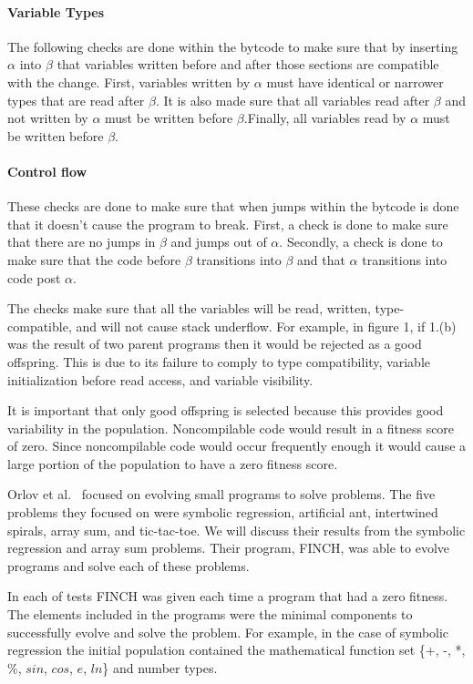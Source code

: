 \documentclass{sig-alternate}
\begin{document}
\paragraph{Variable Types}
The following checks are done within the bytcode to make sure that by inserting $\alpha$ into $\beta$ that variables written before and after those sections are compatible with the change. 
First, variables written by $\alpha$ must have identical or narrower types that are read after $\beta$. It is also made sure that all variables read after $\beta$ and not written by $\alpha$ must be written before $\beta$.Finally, all variables read by $\alpha$ must be written before $\beta$.

\paragraph{Control flow}
These checks are done to make sure that when jumps within the bytcode is done that it doesn't cause the program to break. First, a check is done to make sure that there are no jumps in $\beta$ and jumps out of $\alpha$. Secondly, a check is done to make sure that the code before $\beta$ transitions into $\beta$ and that $\alpha$ transitions into code post $\alpha$.  


The checks make sure that all the variables will be read, written, type-compatible, and will not cause stack underflow\cite{VIII:2011}. For example, in figure 1, if 1.(b) was the result of two parent programs then it would be rejected as a good offspring. This is due to its failure to comply to type compatibility, variable initialization before read access, and variable visibility.\par
It is important that only good offspring is selected because this provides good variability in the population. Noncompilable code would result in a fitness score of zero. Since noncompilable code would occur frequently enough it would cause a large portion of the population to have a zero fitness score.


Orlov et al.~\cite{FINCH:2011} focused on evolving small programs to solve problems. The five problems they focused on were symbolic regression, artificial ant, intertwined spirals, array sum, and tic-tac-toe. We will discuss their results from the symbolic regression and array sum problems. Their program, FINCH, was able to evolve programs and solve each of these problems.

In each of tests FINCH was given each time a program that had a zero fitness. The elements included in the programs were the minimal components to successfully evolve and solve the problem. For example, in the case of symbolic regression the initial population contained the mathematical function set \{+, -, *, \%, $sin$, $cos$, $e$,  $ln$\} and number types.
\end{document}

